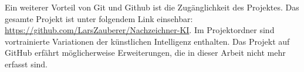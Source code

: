 Ein weiterer Vorteil von Git und Github ist die Zugänglichkeit des Projektes.
Das gesamte Projekt ist unter folgendem Link einsehbar:
\url{https://github.com/LarsZauberer/Nachzeichner-KI}. Im Projektordner sind
vortrainierte Variationen der künstlichen Intelligenz enthalten. Das Projekt auf
GitHub erfährt möglicherweise Erweiterungen, die in dieser Arbeit nicht mehr
erfasst sind.






